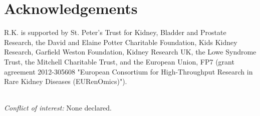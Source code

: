 
\section*{Acknowledgements}

R.K. is supported by St. Peter's Trust for Kidney, Bladder and Prostate Research, the David and Elaine Potter Charitable Foundation, Kids Kidney Research, Garfield Weston Foundation, Kidney Research UK, the Lowe Syndrome Trust, the Mitchell Charitable Trust, and the European Union, FP7 (grant agreement 2012-305608 "European Consortium for High-Throughput Research in Rare Kidney Diseases (EURenOmics)").\\\

\noindent
\textit{Conflict of interest:} None declared.



